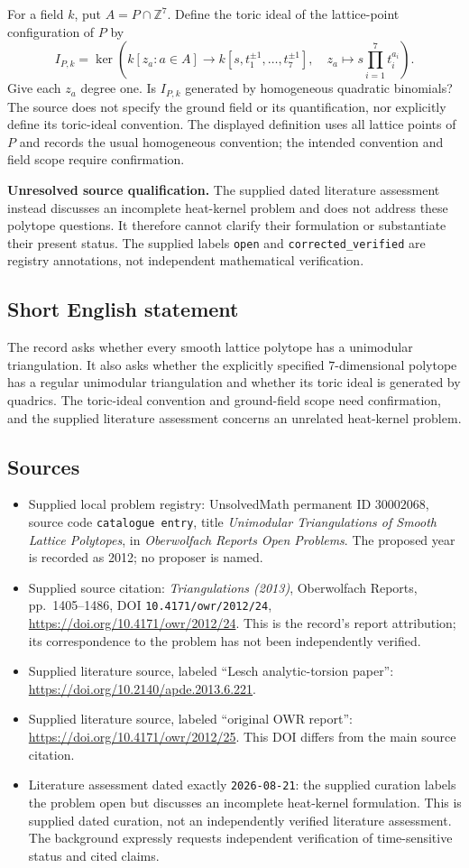 \documentclass[11pt]{article}
\newcommand{\Z}{\mathbb{Z}}
\begin{document}
For a field \(k\), put \(A=P\cap\Z^7\). Define the toric ideal of the lattice-point configuration of \(P\) by
\[
I_{P,k}=\ker\!\left(k[z_a:a\in A]\longrightarrow k[s,t_1^{\pm1},\ldots,t_7^{\pm1}],\quad z_a\longmapsto s\prod_{i=1}^7t_i^{a_i}\right).
\]
Give each \(z_a\) degree one. Is \(I_{P,k}\) generated by homogeneous quadratic binomials? The source does not specify the ground field or its quantification, nor explicitly define its toric-ideal convention. The displayed definition uses all lattice points of \(P\) and records the usual homogeneous convention; the intended convention and field scope require confirmation.

\textbf{Unresolved source qualification.} The supplied dated literature assessment instead discusses an incomplete heat-kernel problem and does not address these polytope questions. It therefore cannot clarify their formulation or substantiate their present status. The supplied labels \texttt{open} and \texttt{corrected\_verified} are registry annotations, not independent mathematical verification.
\subsection{Short English statement}
The record asks whether every smooth lattice polytope has a unimodular triangulation. It also asks whether the explicitly specified \(7\)-dimensional polytope has a regular unimodular triangulation and whether its toric ideal is generated by quadrics. The toric-ideal convention and ground-field scope need confirmation, and the supplied literature assessment concerns an unrelated heat-kernel problem.
\subsection{Sources}
\begin{itemize}
\item Supplied local problem registry: UnsolvedMath permanent ID \(30002068\), source code \texttt{catalogue entry}, title \emph{Unimodular Triangulations of Smooth Lattice Polytopes}, in \emph{Oberwolfach Reports Open Problems}. The proposed year is recorded as 2012; no proposer is named.
\item Supplied source citation: \emph{Triangulations (2013)}, Oberwolfach Reports, pp.~1405--1486, DOI \texttt{10.4171/owr/2012/24}, \url{https://doi.org/10.4171/owr/2012/24}. This is the record's report attribution; its correspondence to the problem has not been independently verified.
\item Supplied literature source, labeled ``Lesch analytic-torsion paper'': \url{https://doi.org/10.2140/apde.2013.6.221}.
\item Supplied literature source, labeled ``original OWR report'': \url{https://doi.org/10.4171/owr/2012/25}. This DOI differs from the main source citation.
\item Literature assessment dated exactly \texttt{2026-08-21}: the supplied curation labels the problem open but discusses an incomplete heat-kernel formulation. This is supplied dated curation, not an independently verified literature assessment. The background expressly requests independent verification of time-sensitive status and cited claims.
\end{itemize}
\end{document}
